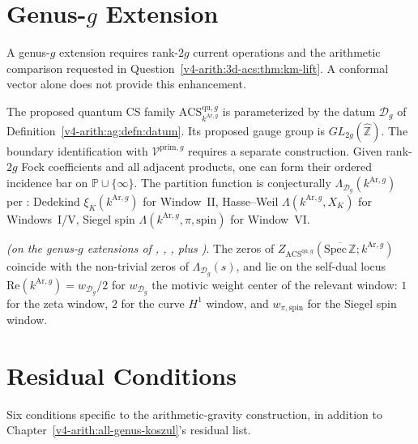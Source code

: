\section{Genus-\texorpdfstring{\(g\)}{g} Extension}
\label{v4-arith:3d-acs:genus-g}

A genus-\(g\) extension requires rank-\(2g\) current operations
and the arithmetic comparison requested in
Question~\ref{v4-arith:3d-acs:thm:km-lift}. A conformal vector alone
does not provide this enhancement.

The proposed quantum CS family
\(\mathrm{ACS}^{\mathrm{qu},g}_{k^{\mathrm{Ar},g}}\) is parameterized
by the datum \(\mathcal D_g\) of Definition~\ref{v4-arith:ag:defn:datum}.
Its proposed gauge group is \(GL_{2g}(\widehat{\mathbb Z})\).
The boundary identification with \(\mathcal V^{\mathrm{prim},g}\)
requires a separate construction. Given rank-\(2g\) Fock coefficients
and all adjacent products, one can form their ordered incidence bar
on \(\mathbb P\cup\{\infty\}\). The
partition function is conjecturally
\(\Lambda_{\mathcal{D}_g}(k^{\mathrm{Ar},g})\) per
: Dedekind
\(\xi_{K}(k^{\mathrm{Ar},g})\) for Window~II, Hasse--Weil
\(\Lambda(k^{\mathrm{Ar},g},X_{K})\) for Windows~I/V, Siegel spin
\(\Lambda(k^{\mathrm{Ar},g},\pi,\mathrm{spin})\) for Window~VI.

\begin{corollary}
\label{v4-arith:3d-acs:cor:all-genus-arith-gravity}
\ClaimStatusConditional \emph{(on the genus-\(g\) extensions of
,
,
,
plus )}. The zeros of
\(Z_{\mathrm{ACS}^{\mathrm{qu},g}}(\overline{\mathrm{Spec}\,\mathbb{Z}};k^{\mathrm{Ar},g})\)
coincide with the non-trivial zeros of \(\Lambda_{\mathcal{D}_g}(s)\),
and lie on the self-dual locus
\(\mathrm{Re}(k^{\mathrm{Ar},g})=w_{\mathcal{D}_g}/2\) for
\(w_{\mathcal{D}_g}\) the motivic weight center of the relevant window:
\(1\) for the zeta window, \(2\) for the curve \(H^{1}\) window, and
\(w_{\pi,\mathrm{spin}}\) for the Siegel spin window.
\end{corollary}

\section{Residual Conditions}
\label{v4-arith:3d-acs:residual}

Six conditions specific to the arithmetic-gravity construction, in addition to
Chapter~\ref{v4-arith:all-genus-koszul}'s residual list.

